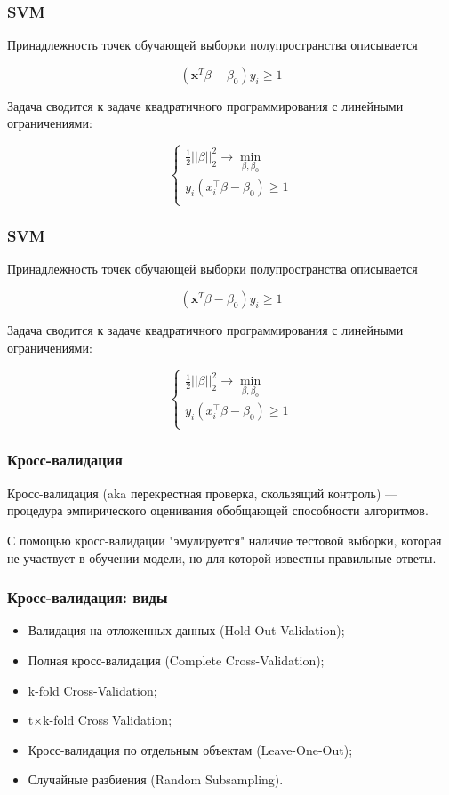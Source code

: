 \documentclass[11pt]{beamer}
\begin{document}
	\begin{frame}
		\frametitle{SVM}
		Принадлежность точек обучающей выборки полупространства описывается
		
		$$ (\bm{x}^T \beta -  \beta_0) y_i \geqslant 1 $$
		
		Задача сводится к задаче квадратичного программирования с линейными ограничениями:
		
		 $$
			 \begin{cases}
			 	\frac{1}{2}||\beta||_2^2\rightarrow \min\limits_{\beta,\beta_0} \\
			 	y_i\left(x_i^\intercal \beta - \beta_0\right) \geqslant 1 \\
			 \end{cases}
		 $$
	
	\end{frame}

	\begin{frame}
	\frametitle{SVM}
		Принадлежность точек обучающей выборки полупространства описывается
		
		$$ (\bm{x}^T \beta -  \beta_0) y_i \geqslant 1 $$
		
		Задача сводится к задаче квадратичного программирования с линейными ограничениями:
		
		$$
		\begin{cases}
			\frac{1}{2}||\beta||_2^2\rightarrow \min\limits_{\beta,\beta_0} \\
			y_i\left(x_i^\intercal \beta - \beta_0\right) \geqslant 1 \\
		\end{cases}
		$$
	
	\end{frame}



	\begin{frame}
		\frametitle{Кросс-валидация}
		Кросс-валидация (aka перекрестная проверка, скользящий контроль) --- процедура эмпирического оценивания обобщающей способности алгоритмов. 
		
		С помощью кросс-валидации "эмулируется" наличие тестовой выборки, которая не участвует в обучении модели, но для которой известны правильные ответы.
		
	\end{frame}
	\begin{frame}
		\frametitle{Кросс-валидация: виды}
		\begin{itemize}
			\item Валидация на отложенных данных (Hold-Out Validation);
			\item Полная кросс-валидация (Complete Cross-Validation);
			\item k-fold Cross-Validation;
			\item t$\times$k-fold Cross Validation;
			\item Кросс-валидация по отдельным объектам (Leave-One-Out);
			\item Случайные разбиения (Random Subsampling).
		\end{itemize}
		
	\end{frame}
\end{document}

